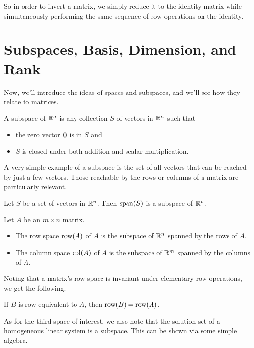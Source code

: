 \documentclass[../m073main.tex]{subfiles}
\begin{document}
So in order to invert a matrix, we simply reduce it to the identity matrix while simultaneously performing the same sequence of row operations on the identity.

\section{Subspaces, Basis, Dimension, and Rank}
Now, we'll introduce the ideas of spaces and subspaces, and we'll see how they relate to matrices.

\begin{definition}[Subspace]
	A subspace of $\mathbb{R}^n$ is any collection $S$ of vectors in $\mathbb{R}^n$ such that
	\begin{itemize}
		\item the zero vector $\mathbf{0}$ is in $S$ and
		\item $S$ is closed under both addition and scalar multiplication.
	\end{itemize}
\end{definition}

A very simple example of a subspace is the set of all vectors that can be reached by just a few vectors.
Those reachable by the rows or columns of a matrix are particularly relevant.

\begin{theorem}
	Let $S$ be a set of vectors in $\mathbb{R}^n$.
	Then $\operatorname{span}(S)$ is a subspace of $\mathbb{R}^n$.
\end{theorem}

\begin{definition}
	Let $A$ be an $m\times n$ matrix.
	\begin{itemize}
		\item The row space $\operatorname{row}(A)$ of $A$ is the subspace of $\mathbb{R}^n$ spanned by the rows of $A$.
		\item The column space $\operatorname{col}(A)$ of $A$ is the subspace of $\mathbb{R}^m$ spanned by the columns of $A$.
	\end{itemize}
\end{definition}

Noting that a matrix's row space is invariant under elementary row operations, we get the following.

\begin{theorem}
	If $B$ is row equivalent to $A$, then $\operatorname{row}(B) = \operatorname{row}(A)$.
\end{theorem}

As for the third space of interest, we also note that the solution set of a homogeneous linear system is a subspace.
This can be shown via some simple algebra.
\end{document}

